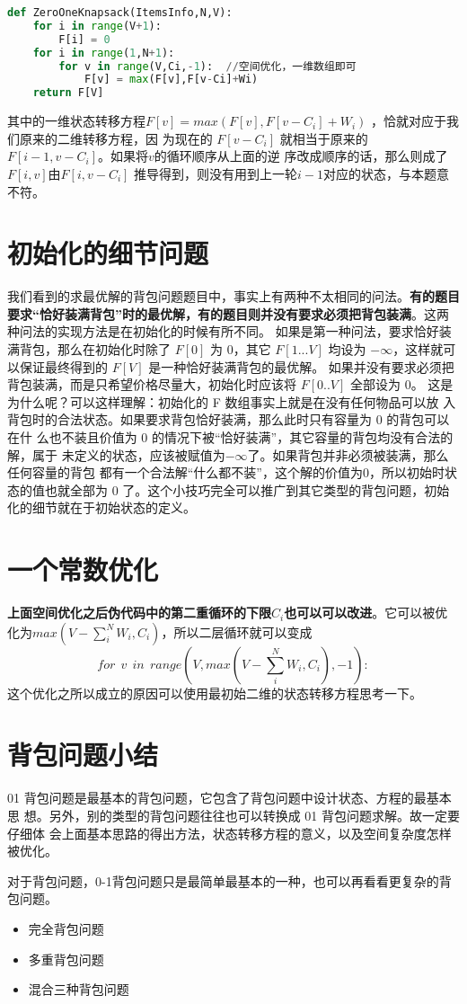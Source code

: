 \begin{lstlisting}[language=python, caption = 优化空间复杂度--二层循环倒序]
def ZeroOneKnapsack(ItemsInfo,N,V):
    for i in range(V+1):
        F[i] = 0
    for i in range(1,N+1):
        for v in range(V,Ci,-1):  //空间优化，一维数组即可
            F[v] = max(F[v],F[v-Ci]+Wi) 
    return F[V]
\end{lstlisting}

其中的一维状态转移方程$F[v] = max(F[v], F[v-C_i] + W_i)$ ，恰就对应于我们原来的二维转移方程，因
为现在的 $F[v-C_i]$ 就相当于原来的 $F[i-1, v-C_i]$。如果将$ v $的循环顺序从上面的逆
序改成顺序的话，那么则成了 $F[i, v] 由 F[i, v-C_i]$ 推导得到，则没有用到上一轮$i-1$对应的状态，与本题意不符。

\section{初始化的细节问题}
我们看到的求最优解的背包问题题目中，事实上有两种不太相同的问法。\textbf{有的题目
要求“恰好装满背包”时的最优解，有的题目则并没有要求必须把背包装满}。这两种问法的实现方法是在初始化的时候有所不同。
如果是第一种问法，要求恰好装满背包，那么在初始化时除了 $F[0]$ 为 $0$，其它
$F[1...V]$ 均设为 $-\infty$，这样就可以保证最终得到的 $F[V]$ 是一种恰好装满背包的最优解。
如果并没有要求必须把背包装满，而是只希望价格尽量大，初始化时应该将 $F[0..V]$
全部设为 $0$。
这是为什么呢？可以这样理解：初始化的 F 数组事实上就是在没有任何物品可以放
入背包时的合法状态。如果要求背包恰好装满，那么此时只有容量为 $0$ 的背包可以在什
么也不装且价值为 $0$ 的情况下被“恰好装满”，其它容量的背包均没有合法的解，属于
未定义的状态，应该被赋值为$-\infty$了。如果背包并非必须被装满，那么任何容量的背包
都有一个合法解“什么都不装”，这个解的价值为$ 0$，所以初始时状态的值也就全部为 $0$
了。这个小技巧完全可以推广到其它类型的背包问题，初始化的细节就在于初始状态的定义。

\section{一个常数优化}
\textbf{上面空间优化之后伪代码中的第二重循环的下限$C_i$也可以可以改进}。它可以被优化为$max(V-\sum_{i}^{N}W_i,C_i)$，所以二层循环就可以变成
$$
for \ \ v \ \ in \ \ range(V,max(V-\sum_{i}^{N}W_i,C_i),-1):
$$
这个优化之所以成立的原因可以使用最初始二维的状态转移方程思考一下。

\section{背包问题小结}
01 背包问题是最基本的背包问题，它包含了背包问题中设计状态、方程的最基本思
想。另外，别的类型的背包问题往往也可以转换成 01 背包问题求解。故一定要仔细体
会上面基本思路的得出方法，状态转移方程的意义，以及空间复杂度怎样被优化。

对于背包问题，0-1背包问题只是最简单最基本的一种，也可以再看看更复杂的背包问题。
\begin{itemize}
	\item 完全背包问题
	\item 多重背包问题
	\item 混合三种背包问题
\end{itemize}



